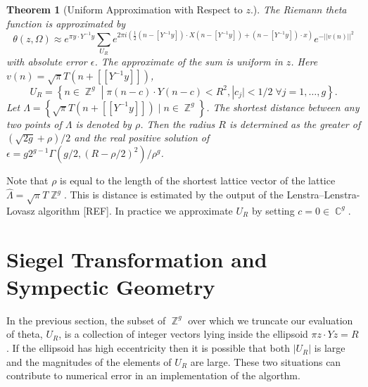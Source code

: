 \documentclass[12]{article}
\newtheorem{theorem}{Theorem}
\DeclareMathOperator{\ZZ}{\mathbb{Z}}
\DeclareMathOperator{\CC}{\mathbb{C}}
\begin{document}
\begin{theorem}[Uniform Approximation with Respect to $z$.]
The Riemann theta function is approximated by
\begin{equation} \label{eqn: uniform}
  \theta(z,\Omega)
  \approx
  e^{\pi y \cdot Y^{-1} y}
  \sum_{U_R} e^{2 \pi i \left( \tfrac{1}{2} \left( n - [Y^{-1}y] \right)
    \cdot X \left( n - [Y^{-1}y] \right) +
    \left( n - [Y^{-1}y] \right) \cdot x \right)}
    e^{- ||v(n)||^2}
\end{equation}
with absolute error $\epsilon$. The approximate of the sum is uniform in $z$.
Here $v(n) = \sqrt{\pi} T \left( n + [[Y^{-1}y]] \right)$,
\begin{equation} \label{eqn: uniform points}
  U_R = \left\{ n \in \ZZ^g \; | \; \pi (n-c) \cdot Y (n-c) < R^2,
                |c_j| < 1/2 \; \forall j = 1,\ldots,g \right\}.
\end{equation}
Let $\Lambda = \left\{ \sqrt{\pi}T \left( n + [[Y^{-1}y]] \right) \; | \; n \in
\ZZ^g \right\}$. The shortest distance between any two points of $\Lambda$ is
denoted by $\rho$. Then the radius $R$ is determined as the greater of
$(\sqrt{2g} + \rho)/2$ and the real positive solution of $\epsilon =
g2^{g-1}\Gamma(g/2,(R-\rho/2)^2)/\rho^g$.
\end{theorem}


Note that $\rho$ is equal to the length of the shortest lattice vector of the
lattice $\hat{\Lambda} = \sqrt{\pi}T\ZZ^g$. This is distance is estimated by
the output of the Lenstra--Lenstra-Lovasz algorithm [REF]. In practice we
approximate $U_R$ by setting $c = 0 \in \CC^g$.


\section{Siegel Transformation and Sympectic Geometry}\label{sec:siegel}



In the previous section, the subset of $\ZZ^g$ over which we truncate our
evaluation of theta, $U_R$, is a collection of integer vectors lying inside the
ellipsoid $\pi z \cdot Yz = R$. If the ellipsoid has high eccentricity then it
is possible that both $|U_R|$ is large and the magnitudes of the elements of
$U_R$ are large. These two situations can contribute to numerical error in an
implementation of the algorthm.
\end{document}
